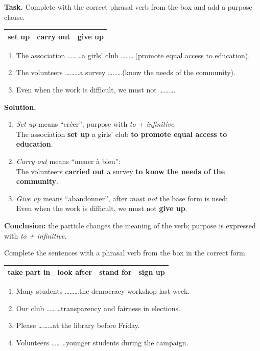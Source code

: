 \documentclass[11pt]{article}
\begin{document}
\begin{exoresolu}
\textbf{Task.} Complete with the correct phrasal verb from the box and add a purpose clause.
\begin{center}
\begin{tabularx}{\linewidth}{|X|X|X|}
\hline
\rowcolor{popblueL} set up & carry out & give up \\
\hline
\end{tabularx}
\end{center}
\begin{enumerate}
\item The association \ldots\ldots\ldots a girls' club \ldots\ldots\ldots (promote equal access to education).
\item The volunteers \ldots\ldots\ldots a survey \ldots\ldots\ldots (know the needs of the community).
\item Even when the work is difficult, we must not \ldots\ldots\ldots .
\end{enumerate}
\tcblower
\textbf{Solution.}
\begin{enumerate}
\item \emph{Set up} means ``créer''; purpose with \emph{to + infinitive}: \\
The association \textbf{set up} a girls' club \textbf{to promote equal access to education}.
\item \emph{Carry out} means ``mener à bien'': \\
The volunteers \textbf{carried out} a survey \textbf{to know the needs of the community}.
\item \emph{Give up} means ``abandonner'', after \emph{must not} the base form is used: \\
Even when the work is difficult, we must not \textbf{give up}.
\end{enumerate}
\textbf{Conclusion:} the particle changes the meaning of the verb; purpose is expressed with \emph{to + infinitive}.
\end{exoresolu}

\begin{exercice}
Complete the sentences with a phrasal verb from the box in the correct form.
\begin{center}
\begin{tabularx}{\linewidth}{|X|X|X|X|}
\hline
\rowcolor{popblueL} take part in & look after & stand for & sign up \\
\hline
\end{tabularx}
\end{center}
\begin{enumerate}
\item Many students \ldots\ldots\ldots the democracy workshop last week.
\item Our club \ldots\ldots\ldots transparency and fairness in elections.
\item Please \ldots\ldots\ldots at the library before Friday.
\item Volunteers \ldots\ldots\ldots younger students during the campaign.
\end{enumerate}
\end{exercice}
\end{document}
